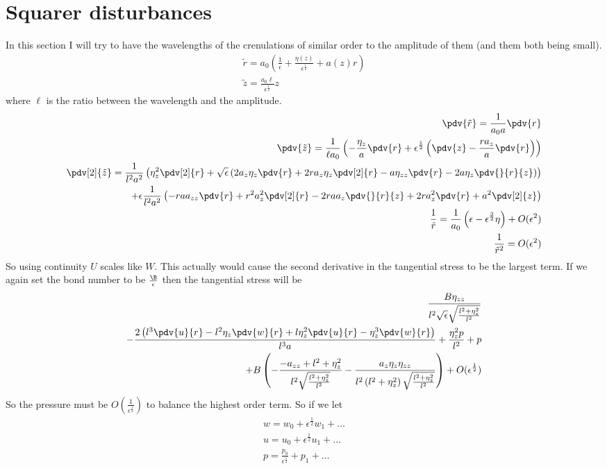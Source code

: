 \documentclass[12pt]{article}
\newcommand{\rt}{^{\frac{1}{2}}}
\newcommand{\rtt}{^{\frac{3}{2}}}
\begin{document}
\section{Squarer disturbances}
In this section I will try to have the wavelengths of the crenulations of similar order to the amplitude of them (and them both being small).
\begin{align}
\tilde{r} = a_0\left(\frac{1}{\epsilon}+\frac{\eta(z)}{\epsilon\rt}+a(z) r\right)\\
\tilde{z} = \frac{a_0\ell}{\epsilon\rt}z
\end{align}
where $\ell$ is the ratio between the wavelength and the amplitude.
	\begin{align}
\pdv{\tilde r } = \frac{1}{a_0a}\pdv{r}\\
\pdv{\tilde z} = \frac{1}{\ell a_0}\left(-\frac{\eta_z}{a}\pdv{r}+\epsilon\rt\left(\pdv{z}-\frac{ra_z}{a}\pdv{r}\right)\right)\\
\pdv[2]{\tilde z}= \frac{1}{l^2 a^2}\left(\eta_{z}^2 \pdv[2]{r}+\sqrt{\epsilon } \left(2 a_{z} \eta_{z} \pdv{r}+2 r a_{z} \eta_{z} \pdv[2]{r}-a \eta_{zz}\pdv{r}-2 a \eta_{z} \pdv{}{r}{z}\right)\right)\\
+\epsilon\frac{1}{l^2 a^2}\left(-r a a_{zz} \pdv{r}+r^2 a_{z}^2 \pdv[2]{r}-2 r a a_{z}\pdv{}{r}{z}+2 r a_{z}^2 \pdv{r}+a^2 \pdv[2]{z}\right)\\
\frac{1}{\tilde r} = \frac{1}{a_0}\left(\epsilon-\epsilon\rtt\eta\right)+O(\epsilon^2)\\
\frac{1}{\tilde r^2} = O(\epsilon^2)\end{align}
So using continuity $U$ scales like $W$. This actually would cause the second derivative in the tangential stress to be the largest term. If we again set the bond number to be $\frac{\B}{\epsilon}$ then the tangential stress will be 
\begin{align}
\frac{B \eta_{zz}}{l^2 \sqrt{\epsilon } \sqrt{\frac{l^2+\eta
			_{z}^2}{l^2}}}\\-\frac{2 \left(l^3 \pdv{u}{r}-l^2 \eta_{z} \pdv{w}{r}+l
	\eta_{z}^2 \pdv{u}{r}-\eta_{z}^3 \pdv{w}{r}\right)}{l^3 a}+\frac{\eta
	_{z}^2 p}{l^2}+p\\+B \left(-\frac{-a_{zz}+l^2+\eta_{z}^2}{l^2
	\sqrt{\frac{l^2+\eta_{z}^2}{l^2}}}-\frac{a_{z} \eta_{z} \eta_{zz}}{l^2
	\left(l^2+\eta_{z}^2\right) \sqrt{\frac{l^2+\eta
			_{z}^2}{l^2}}}\right)+O(\epsilon\rt)
\end{align}
So the pressure must be $O(\frac{1}{\epsilon\rt})$ to balance the highest order term. So if we let  \begin{align}
w = w_0 +\epsilon\rt w_1+\dots\\
u =u_0 +\epsilon\rt u_1+\dots\\
p = \frac{p_0}{\epsilon\rt} +p_1+\dots
\end{align} 
\end{document}
